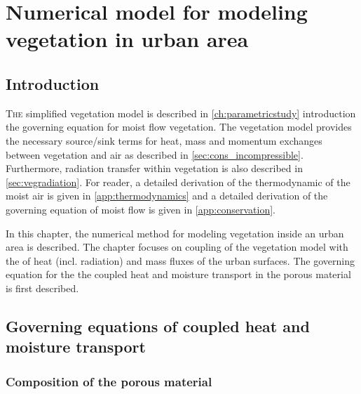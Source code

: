 \chapter{Numerical model for modeling vegetation in urban area}
\label{ch:numericalmethod}
\def\figdir{chapters/ch07_numericalmodel/figures}	

\section{Introduction}

\lettrine[lines=3,nindent=0em,loversize=0.1]{T}{he} simplified vegetation model is described in \cref{ch:parametricstudy} introduction the governing equation for moist flow vegetation. The vegetation model provides the necessary source/sink terms for heat, mass and momentum exchanges between vegetation and air as described in \cref{sec:cons_incompressible}. Furthermore, radiation transfer within vegetation is also described in \cref{sec:vegradiation}. For reader, a detailed derivation of the thermodynamic of the moist air is given in \cref{app:thermodynamics} and a detailed derivation of the governing equation of moist flow is given in \cref{app:conservation}. 

In this chapter, the numerical method for modeling vegetation inside an urban area is described. The chapter focuses on coupling of the vegetation model with the of heat (incl. radiation) and mass fluxes of the urban surfaces. The governing  equation for the the coupled heat and moisture transport in the porous material is first described.

\section{Governing equations of coupled heat and moisture transport}

\subsection{Composition of the porous material}


